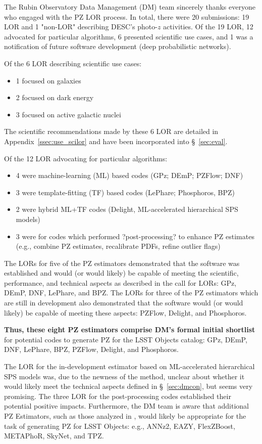 \documentclass[DM,authoryear,toc]{lsstdoc}
\begin{document}
The Rubin Observatory Data Management (DM) team sincerely thanks everyone who engaged with the PZ LOR process.
In total, there were 20 submissions: 19 LOR and 1 "non-LOR" describing DESC's photo-$z$ activities. 
Of the 19 LOR, 12 advocated for particular algorithms, 6 presented scientific use cases, and 1 was a notification of future software development (deep probabilistic networks).

Of the 6 LOR describing scientific use cases:
\begin{itemize}
\item1 focused on galaxies
\item2 focused on dark energy
\item3 focused on active galactic nuclei
\end{itemize}
The scientific recommendations made by these 6 LOR are detailed in Appendix~\ref{ssec:use_scilor} and have been incorporated into \S~\ref{sec:eval}.

Of the 12 LOR advocating for particular algorithms:
\begin{itemize}
\item 4 were machine-learning (ML) based codes (GPz; DEmP; PZFlow; DNF)
\item 3 were template-fitting (TF) based codes (LePhare; Phosphoros, BPZ)
\item 2 were hybrid ML+TF codes (Delight, ML-accelerated hierarchical SPS models)
\item 3 were for codes which performed ?post-processing? to enhance PZ estimates (e.g., combine PZ estimates, recalibrate PDFs, refine outlier flags)
\end{itemize}

The LORs for five of the PZ estimators demonstrated that the software was established and would (or would likely) be capable of meeting the scientific, performance, and technical aspects as described in the call for LORs: GPz, DEmP, DNF, LePhare, and BPZ.
The LORs for three of the PZ estimators which are still in development also demonstrated that the software would (or would likely) be capable of meeting these aspects: PZFlow, Delight, and Phosphoros. 

\textbf{Thus, these eight PZ estimators comprise DM's formal initial shortlist} for potential codes to generate PZ for the LSST Objects catalog: GPz, DEmP, DNF, LePhare, BPZ, PZFlow, Delight, and Phosphoros.

The LOR for the in-development estimator based on ML-accelerated hierarchical SPS models was, due to the newness of the method, unclear about whether it would likely meet the technical aspects defined in \S~\ref{sec:dmcon}, but seems very promising.
The three LOR for the post-processing codes established their potential positive impacts.
Furthermore, the DM team is aware that additional PZ Estimators, such as those analyzed in \cite{2020MNRAS.499.1587S}, would likely be appropriate for the task of generating PZ for LSST Objects: e.g., ANNz2, EAZY, FlexZBoost, METAPhoR, SkyNet, and TPZ.
\end{document}
